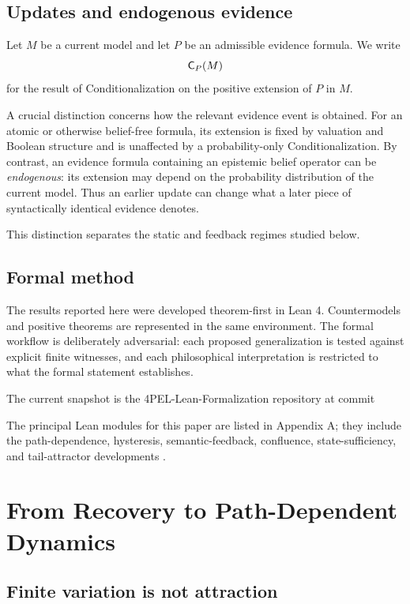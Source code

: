 \subsection{Updates and endogenous evidence}

Let $M$ be a current model and let $P$ be an admissible evidence formula. We write
\[
\mathsf{C}_{P}(M)
\]
for the result of Conditionalization on the positive extension of $P$ in $M$.

A crucial distinction concerns how the relevant evidence event is obtained. For an atomic or otherwise belief-free formula, its extension is fixed by valuation and Boolean structure and is unaffected by a probability-only Conditionalization. By contrast, an evidence formula containing an epistemic belief operator can be \emph{endogenous}: its extension may depend on the probability distribution of the current model. Thus an earlier update can change what a later piece of syntactically identical evidence denotes.

This distinction separates the static and feedback regimes studied below.

\subsection{Formal method}

The results reported here were developed theorem-first in Lean 4. Countermodels and positive theorems are represented in the same environment. The formal workflow is deliberately adversarial: each proposed generalization is tested against explicit finite witnesses, and each philosophical interpretation is restricted to what the formal statement establishes.

The current snapshot is the 4PEL-Lean-Formalization repository at commit\
\begin{center}
\small{}
\end{center}
The principal Lean modules for this paper are listed in Appendix A; they include the path-dependence, hysteresis, semantic-feedback, confluence, state-sufficiency, and tail-attractor developments \cite{repo2026}.

\section{From Recovery to Path-Dependent Dynamics}

\subsection{Finite variation is not attraction}

